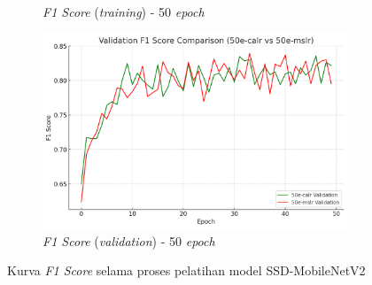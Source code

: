 \begin{figure}[htbp]
\begin{subfigure}{0.45\textwidth}
    \caption{\emph{F1 Score} (\emph{training}) - 50 \emph{epoch}}
  \end{subfigure}
  \hfill
  \begin{subfigure}{0.45\textwidth}
    \includegraphics[width=\textwidth]{gambar/bab4-val-f1-score-50e.png}
    \caption{\emph{F1 Score} (\emph{validation}) - 50 \emph{epoch}}
  \end{subfigure}
  \caption{Kurva \emph{F1 Score} selama proses pelatihan model SSD-MobileNetV2}
  \label{fig:f1_score_curves}
\end{figure}

